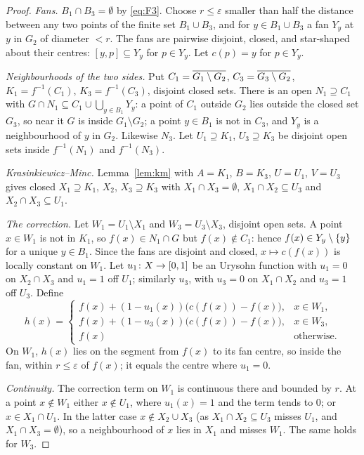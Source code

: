 \begin{proof}
\emph{Fans.} $B_1\cap B_3=\emptyset$ by \eqref{eq:F3}. Choose $r\le\varepsilon$ smaller than half the distance between any two points of the finite set $B_1\cup
B_3$, and for $y\in B_1\cup B_3$ a fan $Y_y$ at $y$ in $G_2$ of diameter $<r$. The fans are pairwise disjoint, closed, and star-shaped about their centres:
$[y,p]\subseteq Y_y$ for $p\in Y_y$. Let $c(p)=y$ for $p\in Y_y$.

\emph{Neighbourhoods of the two sides.} Put $C_1=\overline{G_1\setminus G_2}$, $C_3=\overline{G_3\setminus G_2}$, $K_1=f^{-1}(C_1)$, $K_3=f^{-1}(C_3)$, disjoint closed sets.
There is an open $N_1\supseteq C_1$ with $G\cap N_1\subseteq C_1\cup\bigcup_{y\in B_1}Y_y$: a point of $C_1$ outside $G_2$ lies outside the closed set $G_3$, so
near it $G$ is inside $G_1\setminus G_2$; a point $y\in B_1$ is not in $C_3$, and $Y_y$ is a neighbourhood of $y$ in $G_2$. Likewise $N_3$. Let $U_1\supseteq K_1$,
$U_3\supseteq K_3$ be disjoint open sets inside $f^{-1}(N_1)$ and $f^{-1}(N_3)$.

\emph{Krasinkiewicz--Minc.} Lemma~\ref{lem:km} with $A=K_1$, $B=K_3$, $U=U_1$, $V=U_3$ gives closed $X_1\supseteq K_1$, $X_2$, $X_3\supseteq K_3$ with $X_1\cap
X_3=\emptyset$, $X_1\cap X_2\subseteq U_3$ and $X_2\cap X_3\subseteq U_1$.

\emph{The correction.} Let $W_1=U_1\setminus X_1$ and $W_3=U_3\setminus X_3$, disjoint open sets. A point $x\in W_1$ is not in $K_1$, so $f(x)\in N_1\cap G$ but
$f(x)\notin C_1$: hence $f(x)\in Y_y\setminus\left\{ y \right\}$ for a unique $y\in B_1$. Since the fans are disjoint and closed, $x\mapsto c(f(x))$ is locally constant on $W_1$.
Let $u_1\colon X\to[0,1]$ be an Urysohn function with $u_1=0$ on $X_2\cap X_3$ and $u_1=1$ off $U_1$; similarly $u_3$, with $u_3=0$ on $X_1\cap X_2$ and $u_3=1$ off
$U_3$. Define
\[
h(x)=\begin{cases} f(x)+(1-u_1(x))\bigl(c(f(x))-f(x)\bigr), & x\in W_1,\\ f(x)+(1-u_3(x))\bigl(c(f(x))-f(x)\bigr), & x\in W_3,\\ f(x) & \text{otherwise.}\end{cases}
\]
On $W_1$, $h(x)$ lies on the segment from $f(x)$ to its fan centre, so inside the fan, within $r\le\varepsilon$ of $f(x)$; it equals the centre where $u_1=0$.

\emph{Continuity.} The correction term on $W_1$ is continuous there and bounded by $r$. At a point $x\notin W_1$ either $x\notin U_1$, where $u_1(x)=1$ and the
term tends to $0$; or $x\in X_1\cap U_1$. In the latter case $x\notin X_2\cup X_3$ (as $X_1\cap X_2\subseteq U_3$ misses $U_1$, and $X_1\cap X_3=\emptyset$), so a
neighbourhood of $x$ lies in $X_1$ and misses $W_1$. The same holds for $W_3$.


\end{proof}
